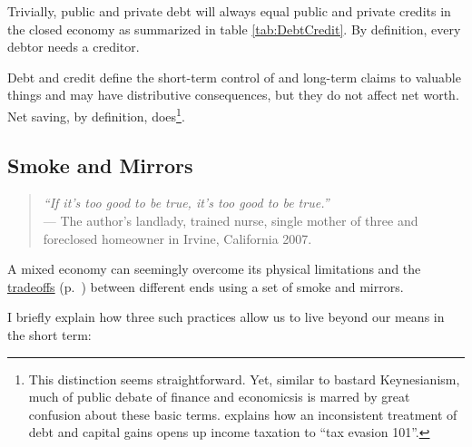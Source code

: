 \begin{enumerate}
	Trivially, public and private debt will always equal public and private credits in the closed economy as summarized in table \ref{tab:DebtCredit}. By definition, every debtor needs a creditor.

	Debt and credit define the short-term control of and long-term claims to valuable things and may have distributive consequences, but they do not affect net worth. Net saving, by definition, does\footnote{
		This distinction seems straightforward. Yet, similar to bastard Keynesianism, much of public debate of finance and economicsis is marred by great confusion about these basic terms. \citealt{McCaffery2005} explains how an inconsistent treatment of debt and capital gains opens up income taxation to ``tax evasion 101''.}.%
\end{enumerate}

\subsection[Smoke and Mirrors]{Smoke and Mirrors} \label{sec:smoke-n-mirrors}

\begin{quote}
	\emph{``If it's too good to be true, it's too good to be true.''\\}
	--- The author's landlady, trained nurse, single mother of three and foreclosed homeowner in Irvine, California 2007.
\end{quote}

A mixed economy can seemingly overcome its physical limitations and the \hyperref[sec:tradeoffs]{tradeoffs} (p.~\pageref{sec:tradeoffs}) between different ends using a set of smoke and mirrors.

I briefly explain how three such practices allow us to live beyond our means in the short term:

